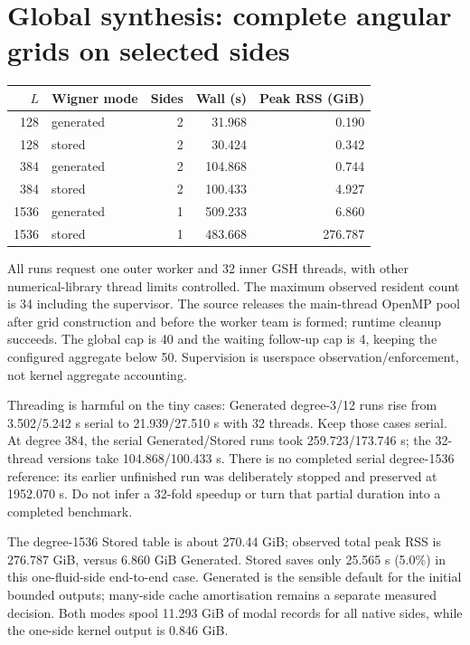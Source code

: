 \documentclass[11pt,a4paper]{article}
\begin{document}
\section{Global synthesis: complete angular grids on selected sides}

\begin{center}
\small
\begin{tabular}{r l r r r}
\toprule
$L$ & Wigner mode & Sides & Wall (s) & Peak RSS (GiB) \\
\midrule
128 & generated & 2 & 31.968 & 0.190 \\
128 & stored & 2 & 30.424 & 0.342 \\
384 & generated & 2 & 104.868 & 0.744 \\
384 & stored & 2 & 100.433 & 4.927 \\
1536 & generated & 1 & 509.233 & 6.860 \\
1536 & stored & 1 & 483.668 & 276.787 \\
\bottomrule
\end{tabular}
\end{center}
All runs request one outer worker and 32 inner GSH threads, with other numerical-library thread limits controlled. The maximum observed resident count is 34 including the supervisor. The source releases the main-thread OpenMP pool after grid construction and before the worker team is formed; runtime cleanup succeeds. The global cap is 40 and the waiting follow-up cap is 4, keeping the configured aggregate below 50. Supervision is userspace observation/enforcement, not kernel aggregate accounting.

Threading is harmful on the tiny cases: Generated degree-3/12 runs rise from 3.502/5.242 s serial to 21.939/27.510 s with 32 threads. Keep those cases serial. At degree 384, the serial Generated/Stored runs took 259.723/173.746 s; the 32-thread versions take 104.868/100.433 s. There is no completed serial degree-1536 reference: its earlier unfinished run was deliberately stopped and preserved at 1952.070 s. Do not infer a 32-fold speedup or turn that partial duration into a completed benchmark.

The degree-1536 Stored table is about 270.44 GiB; observed total peak RSS is 276.787 GiB, versus 6.860 GiB Generated. Stored saves only 25.565 s (5.0\%) in this one-fluid-side end-to-end case. Generated is the sensible default for the initial bounded outputs; many-side cache amortisation remains a separate measured decision. Both modes spool 11.293 GiB of modal records for all native sides, while the one-side kernel output is 0.846 GiB.
\end{document}

